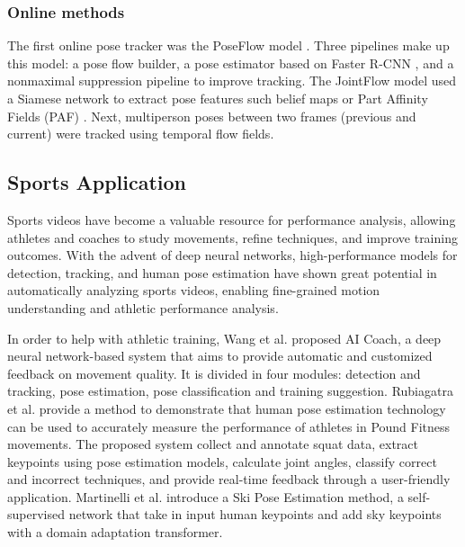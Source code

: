 \subsubsection{Online methods}
The first online pose tracker was the PoseFlow model \cite{xiu2018pose}. Three pipelines make up this model: a pose flow builder, a pose estimator based on Faster R-CNN \cite{ren2015faster}, and a nonmaximal suppression pipeline to improve tracking.
The JointFlow model \cite{doering2018joint} used a Siamese network to extract pose features such belief maps or Part Affinity Fields (PAF) \cite{cao2019openpose}. Next, multiperson poses between two frames (previous and current) were tracked using temporal flow fields.


\subsection{Sports Application}
Sports videos have become a valuable resource for performance analysis, allowing athletes and coaches to study movements, refine techniques, and improve training outcomes. With the advent of deep neural networks, high-performance models for detection, 
tracking, and human pose estimation have shown great potential in automatically analyzing sports videos, enabling fine-grained motion understanding and athletic performance analysis.

In order to help with athletic training, Wang et al. \cite{wang2019ai} proposed AI Coach, a deep neural network-based system that aims to provide automatic and customized feedback on movement quality. It is divided in four modules: 
detection and tracking, pose estimation, pose classification and training suggestion.
Rubiagatra et al. \cite{rubiagatra2024evaluating} provide a method to demonstrate that human pose estimation technology can be used to accurately measure the performance of athletes in Pound Fitness movements. The proposed 
system collect and annotate squat data, extract keypoints using pose estimation models, calculate joint angles, classify correct and incorrect techniques, and provide real-time feedback through a user-friendly application.
Martinelli et al. \cite{martinelli2024ski} introduce a Ski Pose Estimation method, a self-supervised network that take in input human keypoints and add sky keypoints with a domain adaptation transformer.
\newpage


